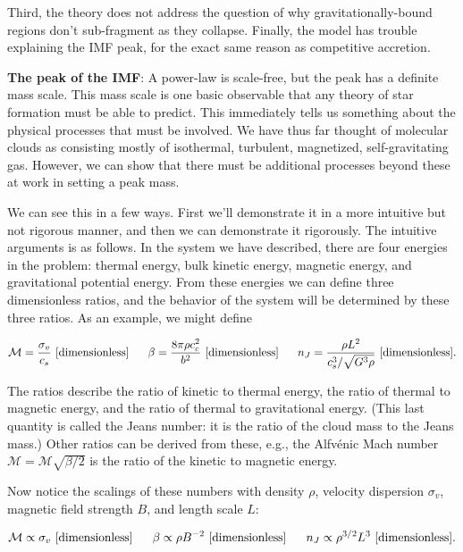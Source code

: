 \documentclass[a4paper,10pt]{article}
\begin{document}
{\noindent}Third, the theory does not address the question of why gravitationally-bound regions don’t sub-fragment as they collapse. Finally, the model has trouble explaining the IMF peak, for the exact same reason as competitive accretion.

{\noindent}\textbf{The peak of the IMF}: A power-law is scale-free, but the peak has a definite mass scale. This mass scale is one basic observable that any theory of star formation must be able to predict. This immediately tells us something about the physical processes that must be involved. We have thus far thought of molecular clouds as consisting mostly of isothermal, turbulent, magnetized, self-gravitating gas. However, we can show that there must be additional processes beyond these at work in setting a peak mass.

{\noindent}We can see this in a few ways. First we'll demonstrate it in a more intuitive but not rigorous manner, and then we can demonstrate it rigorously. The intuitive arguments is as follows. In the system we have described, there are four energies in the problem: thermal energy, bulk kinetic energy, magnetic energy, and gravitational potential energy. From these energies we can define three dimensionless ratios, and the behavior of the system will be determined by these three ratios. As an example, we might define

\begin{align*}
    \mathcal{M}=\frac{\sigma_v}{c_s} ~ [{\rm dimensionless}] ~~~~~ \beta=\frac{8\pi\rho c_c^2}{b^2} ~ [{\rm dimensionless}] ~~~~~ n_J=\frac{\rho L^2}{c_s^3/\sqrt{G^3\rho}} ~ [{\rm dimensionless}].
\end{align*}

{\noindent}The ratios describe the ratio of kinetic to thermal energy, the ratio of thermal to magnetic energy, and the ratio of thermal to gravitational energy. (This last quantity is called the Jeans number: it is the ratio of the cloud mass to the Jeans mass.) Other ratios can be derived from these, e.g., the Alfv\'enic Mach number $\mathcal{M}=\mathcal{M}\sqrt{\beta/2}$ is the ratio of the kinetic to magnetic energy.

{\noindent}Now notice the scalings of these numbers with density $\rho$, velocity dispersion $\sigma_v$, magnetic field strength $B$, and length scale $L$:

\begin{align*}
    \mathcal{M}\propto\sigma_v ~ [{\rm dimensionless}] ~~~~~ \beta\propto\rho B^{-2} ~ [{\rm dimensionless}] ~~~~~ n_J\propto\rho^{3/2}L^3 ~ [{\rm dimensionless}].
\end{align*}
\end{document}
